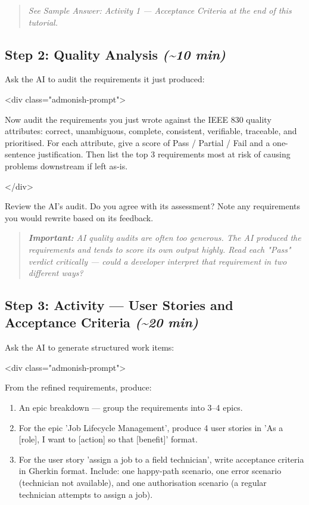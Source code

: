 \documentclass[11pt,a4paper]{book}
\begin{document}
\begin{quote}
\textit{See Sample Answer: Activity 1 --- Acceptance Criteria at the end of this tutorial.}
\end{quote}

\subsection{Step 2: Quality Analysis \textit{(\textasciitilde{}10 min)}}

Ask the AI to audit the requirements it just produced:

<div class="admonish-prompt">

Now audit the requirements you just wrote against the IEEE 830 quality attributes: correct, unambiguous, complete, consistent, verifiable, traceable, and prioritised. For each attribute, give a score of Pass / Partial / Fail and a one-sentence justification. Then list the top 3 requirements most at risk of causing problems downstream if left as-is.

</div>

Review the AI's audit. Do you agree with its assessment? Note any requirements you would rewrite based on its feedback.

\begin{quote}
\textit{\textbf{Important:} AI quality audits are often too generous. The AI produced the requirements and tends to score its own output highly. Read each "Pass" verdict critically --- could a developer interpret that requirement in two different ways?}
\end{quote}

\subsection{Step 3: Activity --- User Stories and Acceptance Criteria \textit{(\textasciitilde{}20 min)}}

Ask the AI to generate structured work items:

<div class="admonish-prompt">

From the refined requirements, produce:

\begin{enumerate}
  \item An epic breakdown --- group the requirements into 3--4 epics.
  \item For the epic 'Job Lifecycle Management', produce 4 user stories in 'As a [role], I want to [action] so that [benefit]' format.
  \item For the user story 'assign a job to a field technician', write acceptance criteria in Gherkin format. Include: one happy-path scenario, one error scenario (technician not available), and one authorisation scenario (a regular technician attempts to assign a job).
\end{enumerate}
\end{document}
